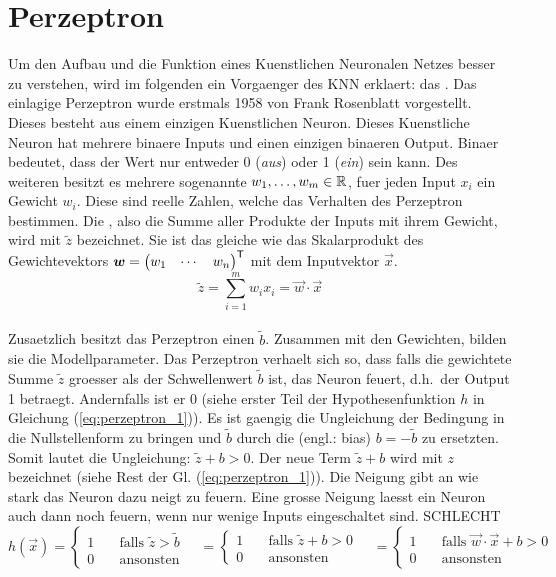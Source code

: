 \section{Perzeptron}
Um den Aufbau und die Funktion eines Kuenstlichen Neuronalen Netzes besser zu
verstehen, wird im folgenden ein Vorgaenger des KNN erklaert: das .
\para{}
Das einlagige Perzeptron wurde erstmals 1958 von Frank Rosenblatt vorgestellt. Dieses
besteht aus einem einzigen Kuenstlichen Neuron. Dieses Kuenstliche Neuron
hat mehrere binaere Inputs und einen einzigen binaeren Output. Binaer
bedeutet, dass der Wert nur entweder 0 (\textit{aus}) oder 1 (\textit{ein}) sein
kann. Des weiteren besitzt es mehrere sogenannte  $w_1, \ldots,
w_m \in \mathbb{R}$, fuer jeden Input $x_i$ ein Gewicht $w_i$.
Diese sind reelle Zahlen, welche das Verhalten des Perzeptron bestimmen.
Die , also die Summe aller Produkte der Inputs mit
ihrem Gewicht, wird mit $\tilde{z}$ bezeichnet.
Sie ist das gleiche wie das Skalarprodukt des Gewichtevektors
$\bm{w} = \begin{pmatrix} w_1 & \cdots & w_n \end{pmatrix}^{\mathsf{T}}$ mit dem
Inputvektor $\vec{x}$. \\
\begin{equation*}
  \tilde{z} = \sum_{i=1}^{m} w_i x_i = \vec{w} \cdot \vec{x}
\end{equation*} \\
Zusaetzlich besitzt das Perzeptron einen  $\tilde{b}$.
Zusammen mit den Gewichten, bilden sie die Modellparameter.
Das Perzeptron verhaelt sich so, dass falls die gewichtete Summe $\tilde{z}$ groesser als der
Schwellenwert $\tilde{b}$ ist, das Neuron feuert, d.h.\ der Output 1 betraegt.
Andernfalls ist er 0 (siehe erster Teil der Hypothesenfunktion $h$ in Gleichung (\ref{eq:perzeptron_1})).
Es ist gaengig die Ungleichung der Bedingung in die Nullstellenform zu bringen
und $\tilde{b}$ durch die  (engl.: bias)
$b = -\tilde{b}$ zu ersetzten. Somit lautet die Ungleichung: $\tilde{z} + b
> 0$. Der neue Term $\tilde{z} + b$ wird mit $z$ bezeichnet (siehe Rest der Gl. (\ref{eq:perzeptron_1})).
Die Neigung gibt an wie stark das Neuron dazu neigt zu feuern. Eine grosse
Neigung laesst ein Neuron auch dann noch feuern, wenn nur wenige Inputs
eingeschaltet sind. SCHLECHT \\
\begin{equation}\label{eq:perzeptron_1}
  h(\vec{x}) =
  \begin{cases}
    1 & \quad \text{falls } \tilde{z} > \tilde{b}\\
    0 & \quad \text{ansonsten}
  \end{cases}
  \quad =
  \begin{cases}
    1 & \quad \text{falls } \tilde{z} + b > 0\\
    0 & \quad \text{ansonsten}
  \end{cases}
  \quad =
  \begin{cases}
    1 & \quad\text{falls } \vec{w} \cdot \vec{x} + b > 0\\
    0 & \quad\text{ansonsten}
  \end{cases}
\end{equation}
